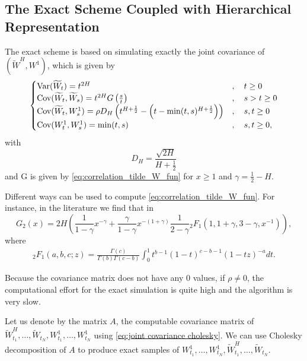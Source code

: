 \subsection{The Exact Scheme Coupled with Hierarchical Representation }\label{sec:The Exact Scheme}
The exact scheme is based on simulating exactly the joint covariance of $(\widetilde{W}^H,W^1)$, which is given by
\begin{align}\label{eq:joint covariance cholesky}
 \begin{cases}
               \text{Var}(\widetilde{W}_t)=t^{2H}&,\quad t \ge 0\\
                \text{Cov}(\widetilde{W}_t,\widetilde{W}_s)=t^{2H} G\left(\frac{s}{t}\right)&,\quad s>t \ge 0\\
              \text{Cov}(\widetilde{W}_t,W^1_s)=\rho D_H \left(t^{H+\frac{1}{2}}-\left( t-\min(t,s)^{H+\frac{1}{2}} \right) \right) &,\quad s,t \ge 0\\
              \text{Cov}(W^1_t,W^1_s)=\min(t,s)&,\quad s,t \ge 0,
            \end{cases}
\end{align}
with 
$$ D_H=\frac{\sqrt{2H}}{H+\frac{1}{2}}$$
and G is given by \eqref{eq:correlation_tilde_W_fun} for $x \ge 1$ and $\gamma=\frac{1}{2}-H$.

Different ways can be used to compute  \eqref{eq:correlation_tilde_W_fun}. For instance, in the literature we find that  in \cite{bayer2018short}
\begin{equation}
G_2(x)=2H \left(  \frac{1}{1-\gamma} x^{-\gamma}+\frac{\gamma}{1-\gamma}x^{-(1+\gamma)} \frac{1}{2-\gamma} {}_2F_1\left(1,1+\gamma,3-\gamma,x^{-1} \right)  \right),
\end{equation}
where 
\begin{align*}
{}_2F_1(a,b,c;z)=\frac{\Gamma(c)}{\Gamma(b) \Gamma(c-b)} \int_{0}^1 t^{b-1} (1-t)^{c-b-1} (1-tz)^{-a} dt.
\end{align*}
\begin{remark}
Because the covariance matrix does not have any $0$ values, if $\rho\neq0$, the computational effort for the exact simulation is quite high and the algorithm is very slow.
\end{remark}
Let us denote by the matrix $A$, the computable covariance matrix of  $ \widetilde{W}^H_{t_1},\dots, \widetilde{W}_{t_N},W^1_{t_1},\dots, W^1_{t_N}$ using \eqref{eq:joint covariance cholesky}.  We can use Cholesky decomposition of $A$ to produce exact samples of $W^1_{t_1},\dots, W^1_{t_N}, \widetilde{W}^H_{t_1},\dots, \widetilde{W}_{t_N}$.

